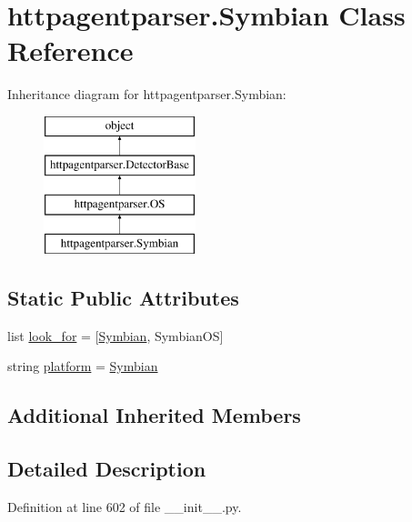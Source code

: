 \hypertarget{classhttpagentparser_1_1_symbian}{}\section{httpagentparser.\+Symbian Class Reference}
\label{classhttpagentparser_1_1_symbian}
Inheritance diagram for httpagentparser.\+Symbian\+:\begin{figure}[H]
\begin{center}
\leavevmode
\includegraphics[height=4.000000cm]{classhttpagentparser_1_1_symbian}
\end{center}
\end{figure}
\subsection*{Static Public Attributes}
\begin{DoxyCompactItemize}
\item 
list \hyperlink{classhttpagentparser_1_1_symbian_af26c3a7969c18ae9a901b49fa610cd94}{look\+\_\+for} = \mbox{[}\textquotesingle{}\hyperlink{classhttpagentparser_1_1_symbian}{Symbian}\textquotesingle{}, \textquotesingle{}Symbian\+OS\textquotesingle{}\mbox{]}
\item 
string \hyperlink{classhttpagentparser_1_1_symbian_a38bd2ff1d0b9e6ddc55a20cb9e8a2f5b}{platform} = \textquotesingle{}\hyperlink{classhttpagentparser_1_1_symbian}{Symbian}\textquotesingle{}
\end{DoxyCompactItemize}
\subsection*{Additional Inherited Members}


\subsection{Detailed Description}


Definition at line 602 of file \+\_\+\+\_\+init\+\_\+\+\_\+.\+py.



